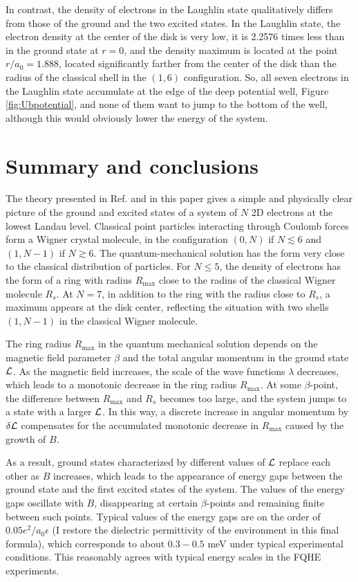 \documentclass[aps,prb,10pt%
]{revtex4-2}
\begin{document}
In contrast, the density of electrons in the Laughlin state qualitatively differs from those of the ground and the two excited states. In the Laughlin state, the electron density at the center of the disk is very low, it is 2.2576 times less than in the ground state at $r=0$, and the density maximum is located at the point $r/a_0=1.888$, located significantly farther from the center of the disk than the radius of the classical shell in the $(1,6)$ configuration. So, all seven electrons in the Laughlin state accumulate at the edge of the deep potential well, Figure \ref{fig:Ubpotential}, and none of them want to jump to the bottom of the well, although this would obviously lower the energy of the system.

\section{Summary and conclusions\label{sec:conclusion}}

The theory presented in Ref. \cite{Mikhailov23a} and in this paper gives a simple and physically clear picture of the ground and excited states of a system of $N$ 2D electrons at the lowest Landau level. Classical point particles interacting through Coulomb forces form a Wigner crystal molecule, in the configuration $(0,N)$ if $N\lesssim 6$ and $(1,N-1)$ if $N\gtrsim 6$. The quantum-mechanical solution has the form very close to the classical distribution of particles. For $N\le 5$, the density of electrons has the form of a ring with radius $R_{\max}$ close to the radius of the classical Wigner molecule $R_s$. At $N=7$, in addition to the ring with the radius close to $R_s$, a maximum appears at the disk center, reflecting the situation with two shells $(1,N-1)$ in the classical Wigner molecule.

The ring radius $R_{\max}$ in the quantum mechanical solution depends on the magnetic field parameter $\beta$ and the total angular momentum in the ground state ${\cal L}$. As the magnetic field increases, the scale of the wave functions $\lambda$ decreases, which leads to a monotonic decrease in the ring radius $R_{\max}$. At some $\beta$-point, the difference between $R_{\max}$ and $R_s$ becomes too large, and the system jumps to a state with a larger ${\cal L}$. In this way, a discrete increase in angular momentum by $\delta {\cal L}$ compensates for the accumulated monotonic decrease in $R_{\max}$ caused by the growth of $B$. 

As a result, ground states characterized by different values of ${\cal L}$ replace each other as $B$ increases, which leads to the appearance of energy gaps between the ground state and the first excited states of the system. The values of the energy gaps oscillate with $B$, disappearing at certain $\beta$-points and remaining finite between such points. Typical values of the energy gaps are on the order of $0.05 e^2/a_0\epsilon$ (I restore the dielectric permittivity of the environment in this final formula), which corresponds to about $0.3-0.5$ meV under typical experimental conditions. This reasonably agrees with typical energy scales in the FQHE experiments. 
\end{document}
